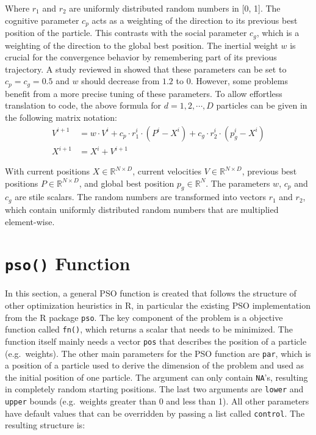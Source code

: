 \documentclass[
  oneside]{book}
\begin{document}
Where \(r_1\) and \(r_2\) are uniformly distributed random numbers in {[}0, 1{]}. The cognitive parameter \(c_p\) acts as a weighting of the direction to its previous best position of the particle. This contrasts with the social parameter \(c_g\), which is a weighting of the direction to the global best position. The inertial weight \(w\) is crucial for the convergence behavior by remembering part of its previous trajectory. A study reviewed in \citep{PaVr2002} showed that these parameters can be set to \(c_p=c_g=0.5\) and \(w\) should decrease from \(1.2\) to \(0\). However, some problems benefit from a more precise tuning of these parameters. To allow effortless translation to code, the above formula for \(d = 1, 2, \cdots, D\) particles can be given in the following matrix notation:
\begin{align*}
  V^{i+1} &= w \cdot V^{i} + c_p \cdot r_1^i \cdot (P^i-X^i) + c_g \cdot r_2^i \cdot (p_g^i - X^i) \\
  X^{i+1} &= X^i + V^{i+1}
\end{align*}

With current positions \(X \in \mathbb{R}^{N \times D}\), current velocities \(V \in \mathbb{R}^{N \times D}\), previous best positions \(P \in \mathbb{R}^{N \times D}\), and global best position \(p_g \in \mathbb{R}^{N}\). The parameters \(w\), \(c_p\) and \(c_g\) are stile scalars. The random numbers are transformed into vectors \(r_1\) and \(r_2\), which contain uniformly distributed random numbers that are multiplied element-wise.

\hypertarget{pso-function}{%
\section{\texorpdfstring{\texttt{pso()} Function}{pso() Function}}\label{pso-function}}

In this section, a general PSO function is created that follows the structure of other optimization heuristics in R, in particular the existing PSO implementation from the R package \texttt{pso}. The key component of the problem is a objective function called \texttt{fn()}, which returns a scalar that needs to be minimized. The function itself mainly needs a vector \texttt{pos} that describes the position of a particle (e.g.~weights). The other main parameters for the PSO function are \texttt{par}, which is a position of a particle used to derive the dimension of the problem and used as the initial position of one particle. The argument can only contain \texttt{NA}'s, resulting in completely random starting positions. The last two arguments are \texttt{lower} and \texttt{upper} bounds (e.g.~weights greater than 0 and less than 1). All other parameters have default values that can be overridden by passing a list called \texttt{control}. The resulting structure is:
\end{document}
